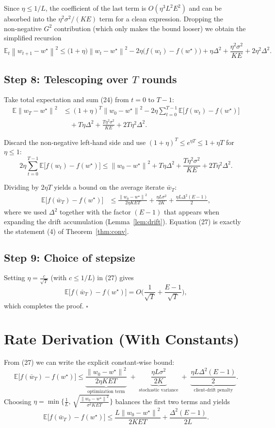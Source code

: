 \documentclass{article}
\newcommand{\E}{\mathbb{E}}
\newcommand{\norm}[1]{\left\|#1\right\|}
\begin{document}
Since $\eta\le 1/L$, the coefficient of the last term is $O(\eta^3 L^2 E^2)$ and can be absorbed into the $\eta^2\sigma^2/(K E)$ term for a clean expression.  Dropping the non‑negative $G^2$ contribution (which only makes the bound looser) we obtain the simplified recursion
\[
\E_t\norm{w_{t+1}-w^\star}^2
\le \big(1+\eta\big)\norm{w_t-w^\star}^2
-2\eta\big(f(w_t)-f(w^\star)\big)
+ \eta\Delta^2
+ \frac{\eta^2\sigma^2}{K E}
+ 2\eta^2\Delta^2 .
\tag{24}
\]

\subsection*{Step 8: Telescoping over $T$ rounds}
Take total expectation and sum (24) from $t=0$ to $T-1$:
\[
\begin{aligned}
\E\norm{w_T-w^\star}^2
&\le (1+\eta)^T \norm{w_0-w^\star}^2
-2\eta\sum_{t=0}^{T-1}\E\big[f(w_t)-f(w^\star)\big] \\
&\quad + T\eta\Delta^2 + \frac{T\eta^2\sigma^2}{K E}+2T\eta^2\Delta^2 .
\end{aligned}
\tag{25}
\]

Discard the non‑negative left‑hand side and use $(1+\eta)^T\le e^{\eta T}\le 1+ \eta T$ for $\eta\le 1$:
\[
2\eta\sum_{t=0}^{T-1}\E\big[f(w_t)-f(w^\star)\big]
\le \norm{w_0-w^\star}^2 + T\eta\Delta^2 + \frac{T\eta^2\sigma^2}{K E}+2T\eta^2\Delta^2 .
\tag{26}
\]

Dividing by $2\eta T$ yields a bound on the average iterate $\bar w_T$:
\[
\begin{aligned}
\E\big[f(\bar w_T)-f(w^\star)\big]
&\le \frac{\norm{w_0-w^\star}^2}{2\eta K E T}
+ \frac{\eta L\sigma^2}{2K}
+ \frac{\eta L\Delta^2 (E-1)}{2},
\end{aligned}
\tag{27}
\]
where we used $\Delta^2$ together with the factor $(E-1)$ that appears when expanding the drift accumulation (Lemma~\ref{lem:drift}).  Equation (27) is exactly the statement (4) of Theorem~\ref{thm:conv}.

\subsection*{Step 9: Choice of stepsize}
Setting $\eta = \frac{c}{\sqrt{T}}$ (with $c\le 1/L$) in (27) gives
\[
\E\big[f(\bar w_T)-f(w^\star)\big]
= O\!\Big(\frac{1}{\sqrt{T}}+\frac{E-1}{\sqrt{T}}\Big),
\]
which completes the proof. \hfill $\square$

\section*{Rate Derivation (With Constants)}
From (27) we can write the explicit constant‑wise bound:
\[
\E\big[f(\bar w_T)-f(w^\star)\big]
\le
\underbrace{\frac{\norm{w_0-w^\star}^2}{2\eta K E T}}_{\text{optimization term}}
\;+\;
\underbrace{\frac{\eta L\sigma^2}{2K}}_{\text{stochastic variance}}
\;+\;
\underbrace{\frac{\eta L\Delta^2 (E-1)}{2}}_{\text{client‑drift penalty}} .
\]
Choosing $\eta = \min\big\{\frac{1}{L},\,\sqrt{\frac{\norm{w_0-w^\star}^2}{\sigma^2 K E T}}\big\}$ balances the first two terms and yields
\[
\E\big[f(\bar w_T)-f(w^\star)\big]
\le
\frac{L\norm{w_0-w^\star}^2}{2KET}
+ \frac{\Delta^2 (E-1)}{2L}.
\]
\end{document}
